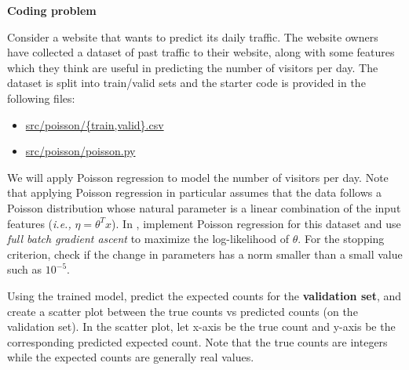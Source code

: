 \item {} \textbf{Coding problem}

Consider a website that wants to predict its
daily traffic. The website owners have collected a dataset of past traffic to
their website, along with some features which they think are useful in
predicting the number of visitors per day. The dataset is split into
train/valid sets and the starter code is provided in the following files:
\begin{center}
\begin{itemize}
\item 	\url{src/poisson/{train,valid}.csv}
\item   \url{src/poisson/poisson.py}
\end{itemize}
\end{center}
We will apply Poisson regression to model the number of visitors per day.
Note that applying Poisson regression in particular assumes that the data
follows a Poisson distribution whose natural parameter is a linear
combination of the input features (\emph{i.e.,} $\eta = \theta^T x$).
In , implement Poisson regression for this dataset
and use \emph{full batch gradient ascent} to maximize the log-likelihood of $\theta$. For the
stopping criterion, check if the change in parameters has a norm smaller than
a small value such as $10^{-5}$.

Using the trained model, predict the expected counts for the \textbf{validation set}, and
create a scatter plot between the true counts vs predicted counts (on the
validation set). In the scatter plot, let x-axis be the true count and y-axis
be the corresponding predicted expected count. Note that the true counts
are integers while the expected counts are generally real values.
